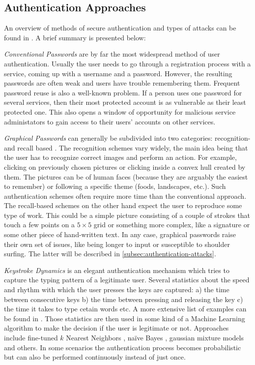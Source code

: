 \subsection{Authentication Approaches}
\label{subsec:secture-authentication-protocols}
An overview of methods of secure authentication and types of attacks can be found in \cite{raza:2012:password-attacks-survey}. A brief summary is presented below:

\emph{Conventional Passwords} are by far the most widespread method of user authentication. Usually the user needs to go through a registration process with a service, coming up with a username and a password. However, the resulting passwords are often weak and users have trouble remembering them. Frequent password reuse is also a well-known problem. If a person uses one password for several services, then their most protected account is as vulnerable as their least protected one. This also opens a window of opportunity for malicious service administators to gain access to their users' accounts on other services.

\emph{Graphical Passwords} can generally be subdivided into two categories: recognition- and recall based \cite{suo:2005:graphical-passwords-survey}. The recognition schemes vary widely, the main idea being that the user has to recognize correct images and perform an action. For example, clicking on previously chosen pictures or clicking inside a convex hull created by them. The pictures can be of human faces (because they are arguably the easiest to remember) or following a specific theme (foods, landscapes, etc.). Such authentication schemes often require more time than the conventional approach. The recall-based schemes on the other hand expect the user to reproduce some type of work. This could be a simple picture consisting of a couple of strokes that touch a few points on a \(5\times 5\) grid or something more complex, like a signature or some other piece of hand-written text. In any case, graphical passwords raise their own set of issues, like being longer to input or susceptible to shoulder surfing. The latter will be described in \ref{subsec:authentication-attacks}.

\emph{Keystroke Dynamics} is an elegant authentication mechanism which tries to capture the typing pattern of a legitimate user. Several statistics about the speed and rhythm with which the user presses the keys are captured: a) the time between consecutive keys b) the time between pressing and releasing the key c) the time it takes to type cetain words etc. A more extensive list of examples can be found in \cite{teh:2013:survey-keystroke-biometrics}. Those statistics are then used in some kind of a Machine Learning algorithm to make the decision if the user is legitimate or not. Approaches include fine-tuned \(k\) Nearest Neighbors \cite{ivannikova:2017:anomaly-detection-keystroke-dynamics}, naïve Bayes \cite{ho:2017:onenb}, gaussian mixture models \cite{yunbin:2013:gmm-keystroke} and others. In some scenarios the authentication process becomes probabilistic but can also be performed continuously instead of just once.

